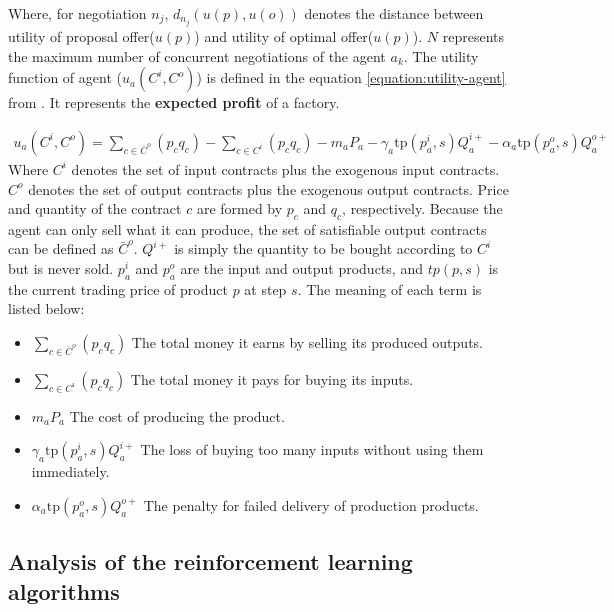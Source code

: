 Where, for negotiation $n_j$, $d_{n_j}(u(p), u(o))$ denotes the distance between utility of proposal offer($u(p)$) and utility of optimal offer($u(p)$). $N$ represents the maximum number of concurrent negotiations of the agent $a_k$. The utility function of agent ($u_{a}\left(C^{i}, C^{o}\right)$) is defined in the equation \ref{equation:utility-agent} from \parencite{Mohammad2021}. It represents the \textbf{expected profit} of a factory.

\begin{equation} \label{equation:utility-agent}
\begin{aligned}
u_{a}\left(C^{i}, C^{o}\right)=\sum_{c \in \bar{C}^{o}}\left(p_{c} q_{c}\right)-\sum_{c \in C^{i}}\left(p_{c} q_{c}\right)-m_{a} P_{a}-\gamma_{a} \mathrm{t} \mathrm{p}\left(p_{a}^{i}, s\right) Q_{a}^{i+}-\alpha_{a} \mathrm{tp}\left(p_{a}^{o}, s\right) Q_{a}^{o+}
\end{aligned}
\end{equation}
Where $C^{i}$ denotes the set of input contracts plus the exogenous input contracts. $C^{o}$ denotes the set of output contracts plus the exogenous output contracts. Price and quantity of the contract $c$ are formed by $p_c$ and $q_c$, respectively. Because the agent can only sell what it can produce, the set of satisfiable output contracts can be defined as $\bar{C}^{o}$. $Q^{i+}$ is simply the quantity to be bought  according to $C^{i}$ but is never sold. $p_{a}^{i}$ and $p_{a}^{o}$ are the input and output products, and $tp(p, s)$ is the current trading price of product $p$ at step $s$. The meaning of each term is listed below:
\begin{itemize}
\item \textbf{$\sum_{c \in \bar{C}^{o}}\left(p_{c} q_{c}\right)$} The total money it earns by selling its produced outputs.  
\item \textbf{$\sum_{c \in C^{i}}\left(p_{c} q_{c}\right)$} The total money it pays for buying its inputs.
\item \textbf{$m_{a} P_{a}$} The cost of producing the product.
\item \textbf{$\gamma_{a} \mathrm{t} \mathrm{p}\left(p_{a}^{i}, s\right) Q_{a}^{i+}$} The loss of buying too many inputs without using them immediately.
\item \textbf{$\alpha_{a} \mathrm{tp}\left(p_{a}^{o}, s\right) Q_{a}^{o+}$} The penalty for failed delivery of production products.
\end{itemize}

\subsection{Analysis of the reinforcement learning algorithms}
